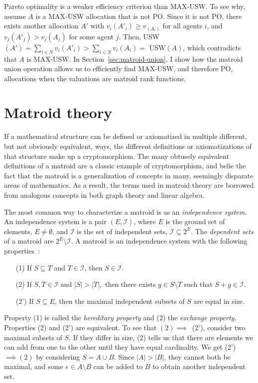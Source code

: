 Pareto optimality is a weaker efficiency criterion than MAX-USW. To see why, assume $A$ is a MAX-USW allocation that is not PO. Since it is not PO, there exists another allocation $A'$ with $v_i(A'_i)\geq v_(A_i)$ for all agents $i$, and $v_j(A'_j) > v_j(A_j)$ for some agent $j$. Then, USW$(A') = \sum_{i\in N} v_i(A'_i) > \sum_{i\in N} v_i(A_i) =$ USW$(A)$, which contradicts that $A$ is MAX-USW. In Section~\ref{sec:matroid-union}, I show how the matroid union operation allows us to efficiently find MAX-USW, and therefore PO, allocations when the valuations are matroid rank functions. 


\section{Matroid theory}
\label{sec:matroid-theory}
If a mathematical structure can be defined or axiomatized in multiple different, but not obviously equivalent, ways, the different definitions or axiomatizations of that structure make up a cryptomorphism. The many obtusely equivalent definitions of a matroid are a classic example of cryptomorphism, and belie the fact that the matroid is a generalization of concepts in many, seemingly disparate areas of mathematics. As a result, the terms used in matroid theory are borrowed from analogous concepts in both graph theory and linear algebra. 

The most common way to characterize a matroid is as an \textit{independence system}. An independence system is a pair $(E, \mathcal{I})$, where $E$ is the ground set of elements, $E \not= \emptyset$, and $\mathcal{I}$ is the set of independent sets, $\mathcal{I} \subseteq 2^E$. The \textit{dependent sets} of a matroid are $2^E \setminus \mathcal{I}$. A matroid is an independence system with the following properties~\cite{whitney-1935}:
\begin{enumerate}
  \item[(1)] If $S \subseteq T$ and $T \in \mathcal{I}$, then $S \in \mathcal{I}$.
  \item[(2)] If $S, T \in \mathcal{I}$ and $|S| > |T|,$ then there exists $g \in S \setminus T$ such that $S + g \in \mathcal{I}$.
  \item[(2')] If $S \subseteq E$, then the maximal independent subsets of $S$ are equal in size.
\end{enumerate}
Property (1) is called the \textit{hereditary property} and (2) the \textit{exchange property}. Properties (2) and (2') are equivalent. To see that $(2) \implies$~(2'), consider two maximal subsets of $S$. If they differ in size, (2) tells us that there are elements we can add from one to the other until they have equal cardinality. We get (2')~$\implies (2)$ by considering $S = A \cup B$. Since $|A|>|B|$, they cannot both be maximal, and some $e \in A \setminus B$ can be added to $B$ to obtain another independent set. 

